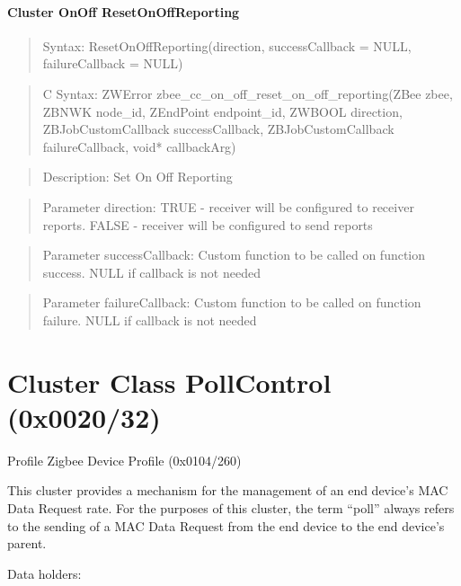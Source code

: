 \paragraph{Cluster OnOff ResetOnOffReporting}
\begin{quote}Syntax: ResetOnOffReporting(direction, successCallback = NULL, failureCallback = NULL)\end{quote}
\begin{quote}C Syntax: ZWError zbee\_cc\_on\_off\_reset\_on\_off\_reporting(ZBee zbee, ZBNWK node\_id, ZEndPoint endpoint\_id, ZWBOOL direction, ZBJobCustomCallback successCallback, ZBJobCustomCallback failureCallback, void* callbackArg)\end{quote}
\begin{quote}Description: Set On Off Reporting\end{quote}
\begin{quote}Parameter direction: TRUE  - receiver will be configured to receiver reports. FALSE - receiver will be configured to send reports\end{quote}
\begin{quote}Parameter successCallback: Custom function to be called on function success. NULL if callback is not needed\end{quote}
\begin{quote}Parameter failureCallback: Custom function to be called on function failure. NULL if callback is not needed\end{quote}



\section{Cluster Class PollControl (0x0020/32)}

Profile Zigbee Device Profile (0x0104/260)

This cluster provides a mechanism for the management of an end device’s MAC Data Request rate. For the purposes of this cluster, the term “poll” always refers to the sending of a MAC Data Request from the end device to the end device’s parent.
\newline

\noindent
Data holders:

